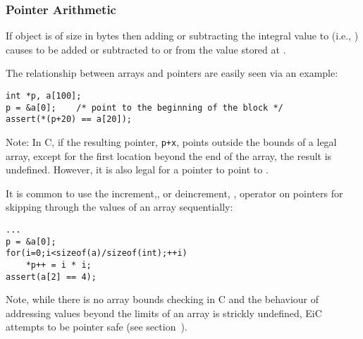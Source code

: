 \subsubsection{Pointer Arithmetic}
\label{sec:PointerArithmetic}

If object  is of size  in bytes then adding or subtracting
the integral value  to  (i.e., ) causes
 to be added or subtracted to or from the value stored
at .

The relationship between arrays
and pointers are easily seen via an example:
\begin{production}
\begin{verbatim}
int *p, a[100];
p = &a[0];    /* point to the beginning of the block */
assert(*(p+20) == a[20]);
\end{verbatim}
\end{production}

Note: In C, if the resulting pointer, {\tt p+x}, points outside the
bounds of a legal array, except for the first location beyond the end
of the array, the result is undefined. However, it is also legal for a
pointer to point to .

It is common to use the increment,\T{++}, or deincrement, \T{--},
operator on pointers for skipping through the values of an array
sequentially:
\begin{production}
\begin{verbatim}
...
p = &a[0];
for(i=0;i<sizeof(a)/sizeof(int);++i)
    *p++ = i * i;
assert(a[2] == 4);
\end{verbatim}
\end{production}

Note, while there is no array bounds checking in C
and the behaviour of addressing values beyond the limits of an array
is strickly undefined, EiC attempts to be pointer
safe (see section~). 


